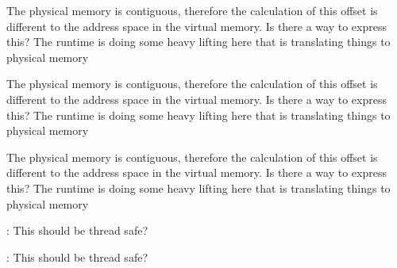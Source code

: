 \begin{DoxyRefList}
\item[Member \mbox{\hyperlink{class_up_down_1_1_sim_u_d_runtime__t_a112bba7e502827b810ab98efbf114298}{Up\+Down\+::Sim\+UDRuntime\+\_\+t\+::test\+\_\+addr}} (uint8\+\_\+t ud\+\_\+id, uint8\+\_\+t lane\+\_\+num, uint32\+\_\+t offset, word\+\_\+t expected=1)]\label{todo__todo000011}%
%
The physical memory is contiguous, therefore the calculation of this offset is different to the address space in the virtual memory. Is there a way to express this? The runtime is doing some heavy lifting here that is translating things to physical memory  
\item[Member \mbox{\hyperlink{class_up_down_1_1_sim_u_d_runtime__t_a32ebe16466d123ae02b3f0a56f159e1d}{Up\+Down\+::Sim\+UDRuntime\+\_\+t\+::test\+\_\+wait\+\_\+addr}} (uint8\+\_\+t ud\+\_\+id, uint8\+\_\+t lane\+\_\+num, uint32\+\_\+t offset, word\+\_\+t expected=1)]\label{todo__todo000012}%
%
The physical memory is contiguous, therefore the calculation of this offset is different to the address space in the virtual memory. Is there a way to express this? The runtime is doing some heavy lifting here that is translating things to physical memory  
\item[Member \mbox{\hyperlink{class_up_down_1_1_sim_u_d_runtime__t_a42d83d235215dc1897eca7a5ee09fc7d}{Up\+Down\+::Sim\+UDRuntime\+\_\+t\+::ud2t\+\_\+memcpy}} (void $\ast$data, uint64\+\_\+t size, uint8\+\_\+t ud\+\_\+id, uint8\+\_\+t lane\+\_\+num, uint32\+\_\+t offset)]\label{todo__todo000010}%
%
The physical memory is contiguous, therefore the calculation of this offset is different to the address space in the virtual memory. Is there a way to express this? The runtime is doing some heavy lifting here that is translating things to physical memory  
\item[Member \mbox{\hyperlink{class_up_down_1_1_u_d_runtime__t_aa02ee38bf2166f297f40176c88485c1a}{Up\+Down\+::UDRuntime\+\_\+t\+::mm\+\_\+free}} (void $\ast$ptr)]\label{todo__todo000005}%
%
\+: This should be thread safe? 
\item[Member \mbox{\hyperlink{class_up_down_1_1_u_d_runtime__t_a3f6d1895e3d1ad7fc40b918154a027ad}{Up\+Down\+::UDRuntime\+\_\+t\+::mm\+\_\+malloc}} (uint64\+\_\+t size)]\label{todo__todo000004}%
%
\+: This should be thread safe?
\end{DoxyRefList}